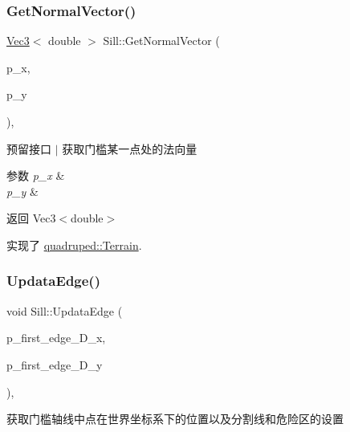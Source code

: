 \subsubsection{\texorpdfstring{Get\+Normal\+Vector()}{GetNormalVector()}}
{\footnotesize\ttfamily \hyperlink{cppTypes_8h_a65c27bf97693676535dd0b30ea0ad399}{Vec3}$<$ double $>$ Sill\+::\+Get\+Normal\+Vector (\begin{DoxyParamCaption}\item[{double}]{p\+\_\+x,  }\item[{double}]{p\+\_\+y }\end{DoxyParamCaption})\hspace{0.3cm}{\ttfamily [override]}, {\ttfamily [virtual]}}



预留接口 $\vert$ 获取门槛某一点处的法向量 


\begin{DoxyParams}{参数}
{\em p\+\_\+x} & \\
\hline
{\em p\+\_\+y} & \\
\hline
\end{DoxyParams}
\begin{DoxyReturn}{返回}
Vec3$<$double$>$ 
\end{DoxyReturn}


实现了 \hyperlink{classquadruped_1_1Terrain}{quadruped\+::\+Terrain}.

\mbox{\label{classquadruped_1_1Sill_adfcc36758c795efe14d355c5adbd2d0d}} 
\subsubsection{\texorpdfstring{Updata\+Edge()}{UpdataEdge()}}
{\footnotesize\ttfamily void Sill\+::\+Updata\+Edge (\begin{DoxyParamCaption}\item[{double}]{p\+\_\+first\+\_\+edge\+\_\+\+D\+\_\+x,  }\item[{double}]{p\+\_\+first\+\_\+edge\+\_\+\+D\+\_\+y }\end{DoxyParamCaption})\hspace{0.3cm}{\ttfamily [override]}, {\ttfamily [virtual]}}



获取门槛轴线中点在世界坐标系下的位置以及分割线和危险区的设置 


